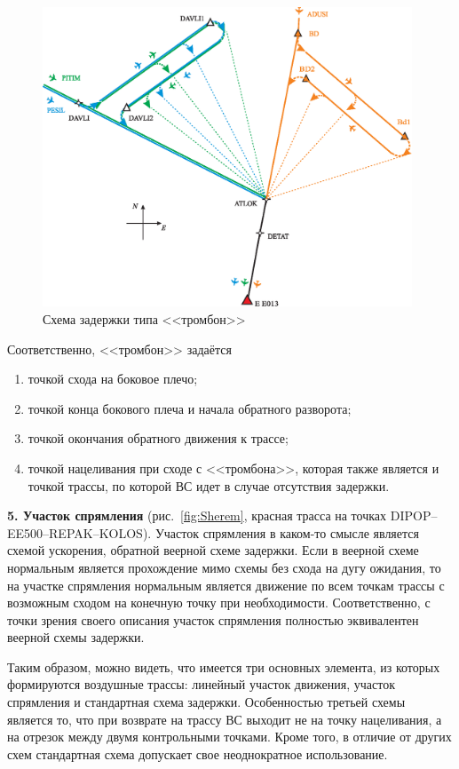 \documentclass[12pt]{article}
\theoremstyle{plain}
\begin{document}
\begin{figure}[h]
\centering

\includegraphics[width=11cm]{Scheme03_plane.eps}    %

\caption{Схема задержки типа <<тромбон>>} 
\label{fig:TromboneScheme}
\end{figure}

Соответственно, <<тромбон>> задаётся 
\begin{enumerate}[topsep=-0.5\parsep,itemsep=-0.5\parsep]
  \item точкой схода на боковое плечо; 
  \item точкой конца бокового плеча и начала обратного разворота;
  \item точкой окончания обратного движения к трассе;
  \item точкой нацеливания при сходе с <<тромбона>>, которая также является и точкой трассы, по которой ВС идет в случае отсутствия задержки.
\end{enumerate}

\medskip

\textbf{5. Участок спрямления} (рис.~\ref{fig:Sherem}, красная трасса на точках DIPOP--EE500--REPAK--KOLOS). Участок спрямления в каком-то смысле является схемой ускорения, обратной веерной схеме задержки. Если в веерной схеме нормальным является прохождение мимо схемы без схода на дугу ожидания, то на участке спрямления нормальным является движение по всем точкам трассы с возможным сходом на конечную точку при необходимости. Соответственно, с точки зрения своего описания участок спрямления полностью эквивалентен веерной схемы задержки.

\medskip

Таким образом, можно видеть, что имеется три основных элемента, из которых формируются воздушные трассы: линейный участок движения, участок спрямления и стандартная схема задержки. Особенностью третьей схемы является то, что при возврате на трассу ВС выходит не на точку нацеливания, а на отрезок между двумя контрольными точками. Кроме того, в отличие от других схем стандартная схема допускает свое неоднократное использование.
\end{document}
